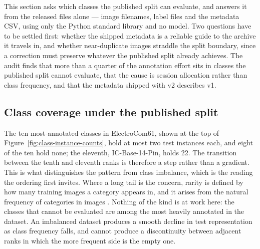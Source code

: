 %

This section asks which classes the published split can evaluate, and answers it
from the released files alone --- image filenames, label files and the metadata
CSV, using only the Python standard library and no model. Two questions have to
be settled first: whether the shipped metadata is a reliable guide to the archive
it travels in, and whether near-duplicate images straddle the split boundary,
since a correction must preserve whatever the published split already achieves.
The audit finds that more than a quarter of the annotation effort sits in classes
the published split cannot evaluate, that the cause is session allocation rather
than class frequency, and that the metadata shipped with v2 describes v1.

\subsection{Class coverage under the published split}
\label{sec:class-coverage}

The ten most-annotated classes in ElectroCom61, shown at the top of
Figure~\ref{fig:class-instance-counts}, hold at most two test instances each, and
eight of the ten hold none; the eleventh, IC-Base-14-Pin, holds 22.
The transition between the tenth and eleventh ranks is therefore a step rather
than a gradient. This is what distinguishes the pattern from class imbalance,
which is the reading the ordering first invites. Where a long tail is the
concern, rarity is defined by how many training images a category appears in, and
it arises from the natural frequency of categories in images
\citep{gupta2019lvis}. Nothing of the kind is at work here: the classes that
cannot be evaluated are among the most heavily annotated in the dataset. An
imbalanced dataset produces a smooth decline in test representation as class
frequency falls, and cannot produce a discontinuity between adjacent ranks in
which the more frequent side is the empty one.

